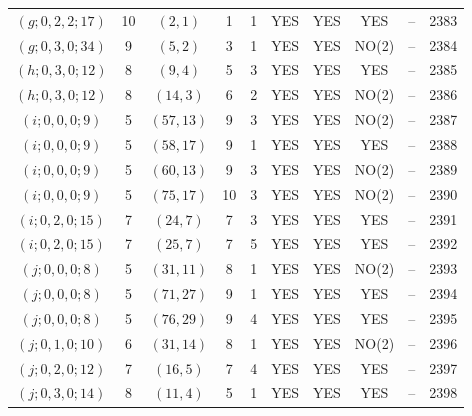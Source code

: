 \begin{longtable}{|c|c|c|c|c|c|c|c|c|c|}
$(g; 0, 2, 2; 17)$ & 10 & $(2, 1)$ & 1 & 1 & YES & YES & YES & -- & 2383\\
$(g; 0, 3, 0; 34)$ & 9 & $(5, 2)$ & 3 & 1 & YES & YES & NO(2) & -- & 2384\\
$(h; 0, 3, 0; 12)$ & 8 & $(9, 4)$ & 5 & 3 & YES & YES & YES & -- & 2385\\
$(h; 0, 3, 0; 12)$ & 8 & $(14, 3)$ & 6 & 2 & YES & YES & NO(2) & -- & 2386\\
$(i; 0, 0, 0; 9)$ & 5 & $(57, 13)$ & 9 & 3 & YES & YES & NO(2) & -- & 2387\\
$(i; 0, 0, 0; 9)$ & 5 & $(58, 17)$ & 9 & 1 & YES & YES & YES & -- & 2388\\
$(i; 0, 0, 0; 9)$ & 5 & $(60, 13)$ & 9 & 3 & YES & YES & NO(2) & -- & 2389\\
$(i; 0, 0, 0; 9)$ & 5 & $(75, 17)$ & 10 & 3 & YES & YES & NO(2) & -- & 2390\\
$(i; 0, 2, 0; 15)$ & 7 & $(24, 7)$ & 7 & 3 & YES & YES & YES & -- & 2391\\
$(i; 0, 2, 0; 15)$ & 7 & $(25, 7)$ & 7 & 5 & YES & YES & YES & -- & 2392\\
$(j; 0, 0, 0; 8)$ & 5 & $(31, 11)$ & 8 & 1 & YES & YES & NO(2) & -- & 2393\\
$(j; 0, 0, 0; 8)$ & 5 & $(71, 27)$ & 9 & 1 & YES & YES & YES & -- & 2394\\
$(j; 0, 0, 0; 8)$ & 5 & $(76, 29)$ & 9 & 4 & YES & YES & YES & -- & 2395\\
$(j; 0, 1, 0; 10)$ & 6 & $(31, 14)$ & 8 & 1 & YES & YES & NO(2) & -- & 2396\\
$(j; 0, 2, 0; 12)$ & 7 & $(16, 5)$ & 7 & 4 & YES & YES & YES & -- & 2397\\
$(j; 0, 3, 0; 14)$ & 8 & $(11, 4)$ & 5 & 1 & YES & YES & YES & -- & 2398
\end{longtable}
